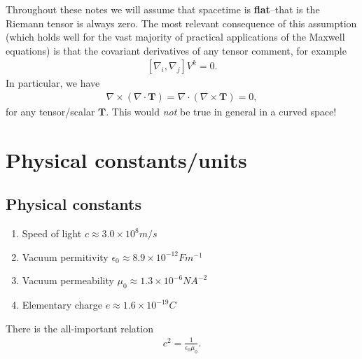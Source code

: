 \documentclass[12pt]{report}
\newcommand{\bT}{{\bm T}}
\begin{document}
Throughout these notes we will assume that spacetime is \textbf{flat}--that is the Riemann tensor is always zero.
The most relevant consequence of this assumption (which holds well for the vast majority of practical applications of the Maxwell equations) is that the covariant derivatives of any tensor comment, for example
\begin{align}
    \left[\nabla_i,\nabla_j\right]V^k
    =
    0
    .
\end{align}
In particular, we have
\begin{align}
    \nabla\times\left(\nabla \cdot \bT\right) 
    =
    \nabla\cdot\left(\nabla \times \bT\right)
    =
    0
    ,
\end{align}
for any tensor/scalar $\bT$.
This would \emph{not} be true in general in a curved space! 

\chapter{Physical constants/units}

\section{Physical constants}
\begin{enumerate}
    \item Speed of light $c\approx 3.0 \times 10^8 m/s$
    \item Vacuum permitivity $\epsilon_0\approx 8.9 \times 10^{-12} F m^{-1}$
    \item Vacuum permeability $\mu_0\approx 1.3\times 10^{-6} N A^{-2}$
    \item Elementary charge $e\approx 1.6\times 10^{-19}C$
\end{enumerate}

There is the all-important relation
\begin{align}
    c^2
    =
    \frac{1}{\epsilon_0\mu_0}
    .
\end{align}
\end{document}
